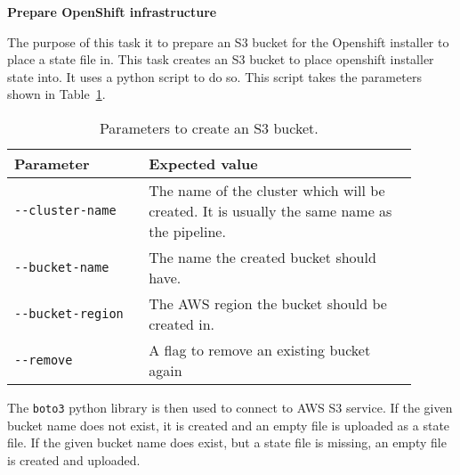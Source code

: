 \textbf{Prepare OpenShift infrastructure}

The purpose of this task it to prepare an S3 bucket for the Openshift installer to place a state file in.
This task creates an S3 bucket to place openshift installer state into.
It uses a python script to do so.
This script takes the parameters shown in Table~\ref{tab:parameters-to-create-an-s3-bucket}.

\begin{table}[H]
    \centering
    \caption{Parameters to create an S3 bucket.}
    \label{tab:parameters-to-create-an-s3-bucket}
    \begin{tabular}{p{0.3\linewidth}|p{0.6\linewidth}}
        Parameter & Expected value \\
        \hline
        \verb|--cluster-name| & The name of the cluster which will be created.
            It is usually the same name as the pipeline. \\
        \verb|--bucket-name| & The name the created bucket should have. \\
        \verb|--bucket-region| & The AWS region the bucket should be created in. \\
        \verb|--remove| & A flag to remove an existing bucket again \\
    \end{tabular}
\end{table}

The \verb|boto3| python library is then used to connect to AWS S3 service.
If the given bucket name does not exist, it is created and an empty file is uploaded as a state file.
If the given bucket name does exist, but a state file is missing, an empty file is created and uploaded.
